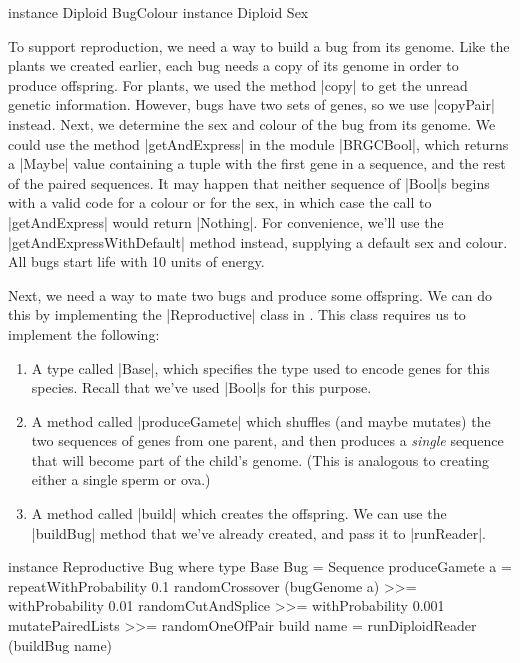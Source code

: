 \begin{code}
instance Diploid BugColour
instance Diploid Sex
\end{code} 

To support reproduction, we need a way to build a bug from its genome.
Like the plants we created earlier, each bug needs a copy of its genome in order to produce offspring.
For plants, we used the method |copy| to get the unread genetic information.
However, bugs have two sets of genes, so we use |copyPair| instead.
Next, we determine the sex and colour of the bug from its genome.
We could use the method |getAndExpress| in the module |BRGCBool|, 
which returns a |Maybe| value containing a tuple with the first gene in a sequence,
and the rest of the paired sequences.
It may happen that neither sequence of |Bool|s begins with
a valid code for a colour or for the sex, in which case the call to |getAndExpress|
would return |Nothing|.
For convenience, we'll use the |getAndExpressWithDefault| method instead,
supplying a default sex and colour.
All bugs start life with 10 units of energy.

Next, we need a way to mate two bugs and produce some offspring.
We can do this by implementing the |Reproductive| class in 
.
This class requires us to implement the following:
\begin{enumerate}
\item A type called |Base|, which specifies the type used to encode
genes for this species. Recall that we've used |Bool|s for this purpose.
\item A method called |produceGamete| which shuffles (and maybe mutates)
the two sequences of genes from one parent, 
and then produces a \emph{single} sequence that will become part of the
child's genome.
(This is analogous to creating either a single sperm or ova.)
\item A method called |build| which creates the offspring.
We can use the |buildBug| method that we've already created,
and pass it to |runReader|.
\end {enumerate}

\begin{code}
instance Reproductive Bug where
  type Base Bug = Sequence
  produceGamete a = 
    repeatWithProbability 0.1 randomCrossover (bugGenome a) >>=
    withProbability 0.01 randomCutAndSplice >>=
    withProbability 0.001 mutatePairedLists >>=
    randomOneOfPair
  build name = runDiploidReader (buildBug name)
\end{code} 

